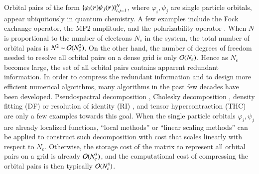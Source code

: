 Orbital pairs of the form $\{\varphi_{i}(\bm{r})\psi_{j}(\bm{r})\}_{i,j=1}^{N}$, where
$\varphi_{i}, \psi_{j}$ are single particle orbitals, appear ubiquitously in
quantum chemistry. A few examples include the Fock exchange operator, the MP2
amplitude, and the polarizability operator \cite{SzaboOstlund1989,Martin2004}.
When $N$ is proportional to the number of electrons $N_{e}$ in the system, the
total number of orbital pairs is $N^2\mathbin{\sim}\mathcal{O}(N_{e}^2)$. On the other
hand, the number of degrees of freedom needed to resolve all orbital pairs on a
dense grid is only $\mathcal{O}(N_{e})$.  Hence as $N_{e}$ becomes large, the set of
all orbital pairs contains apparent redundant information. In order to compress
the redundant information and to design more efficient numerical algorithms,
many algorithms in the past few decades have been developed. Pseudospectral
decomposition \cite{MurphyJCP1995,ReynoldsJCP1996}, Cholesky decomposition 
\cite{BeebeLinderberg1977,KochSanchezdePedersen2003,AquilantePedersenLindh2007,
ManzerHornMardirossianEtAl2015}, density fitting (DF) or resolution of identity
(RI) \cite{NJP_14_053020_2012,Weigend2002}, and tensor hypercontraction (THC) 
\cite{ParrishHohensteinMartinezEtAl2012,ParrishHohensteinMartinezEtAl2013} are
only a few examples towards this goal. When the single particle orbitals
$\varphi_{i},\psi_{j}$ are already localized functions, ``local methods'' or
``linear scaling methods'' \cite{Goedecker1999, RPP_75_036503_2010_ON,
GuidonHutterVandevondele2010, CP_356_98_2009} can be applied to construct such
decomposition with cost that scales linearly with respect to $N_{e}$. Otherwise,
the storage cost of the matrix to represent all orbital pairs on a grid is
already $\mathcal{O}(N_{e}^3)$, and the computational cost of compressing the orbital
pairs is then typically $\mathcal{O}(N_{e}^{4})$.

